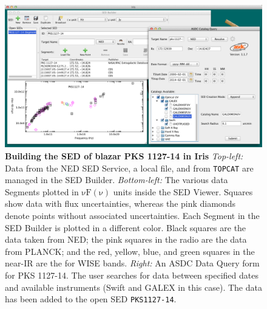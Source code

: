 \documentclass[final,5p,authoryear]{elsarticle}
\begin{document}
\begin{figure} \centering
\includegraphics[height=0.3\textheight]{figures/built-in-visuals-loading1.png}
\caption{\textbf{Building the SED of blazar PKS 1127-14 in Iris}
\textit{Top-left:} Data from the NED SED Service, a local file, and from \texttt{TOPCAT}
are managed in the SED Builder. \textit{Bottom-left:} The various data Segments
plotted in $\mathrm{\nu F \left( \nu \right)}$ units inside the SED Viewer.
Squares show data with flux uncertainties, whereas the pink diamonds denote
points without associated uncertainties. Each Segment in the SED Builder is
plotted in a different color. Black squares are the data taken from NED; the
pink squares in the radio are the data from PLANCK; and the red, yellow, blue,
and green squares in the near-IR are the for WISE bands. \textit{Right:} An ASDC
Data Query form for PKS 1127-14. The user searches for data between specified
dates and available instruments (Swift and GALEX in this case). The data has
been added to the open SED \texttt{PKS1127-14}.} \label{fig:load_data}
\end{figure}
\end{document}
